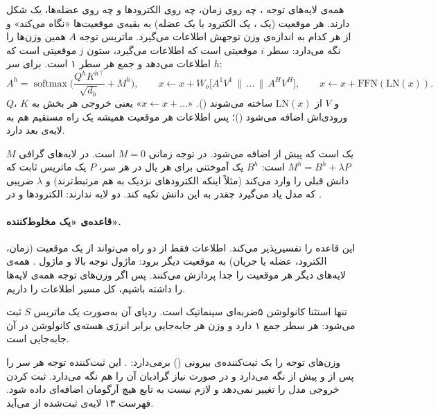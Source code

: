 همه‌ی لایه‌های توجه ، چه روی زمان، چه روی الکترودها و چه روی عضله‌ها، یک شکل دارند. هر موقعیت (یک ، یک الکترود یا یک عضله) به بقیه‌ی موقعیت‌ها «نگاه می‌کند» و از هر کدام به اندازه‌ی وزن توجهش اطلاعات می‌گیرد. ماتریس توجه $A$ همین وزن‌ها را نگه می‌دارد: سطر $i$ موقعیتی است که اطلاعات می‌گیرد، ستون $j$ موقعیتی است که اطلاعات می‌دهد و جمع هر سطر ۱ است. برای سر $h$:
\begin{equation}
A^{h}=\operatorname{softmax}\!\Big(\frac{Q^{h}K^{h\top}}{\sqrt{d_h}}+M^{h}\Big),\qquad
x\leftarrow x+W_o\big[A^{1}V^{1}\,\|\,\dots\,\|\,A^{H}V^{H}\big],\qquad x\leftarrow x+\mathrm{FFN}(\mathrm{LN}(x)).
\end{equation}
$Q$، $K$ و $V$ از $\mathrm{LN}(x)$ ساخته می‌شوند (). «$x\leftarrow x+\dots$» یعنی خروجی هر بخش به ورودی‌اش اضافه می‌شود ()؛ پس اطلاعات هر موقعیت همیشه یک راه مستقیم هم به لایه‌ی بعد دارد.

$M$ یک  است که پیش از  اضافه می‌شود. در توجه زمانی $M=0$ است. در لایه‌های گرافی $M^{h}=B^{h}+\lambda P$ است: $B^{h}$ یک  آموختنی برای هر یال در هر سر، $P$ یک ماتریس ثابت که دانش قبلی را وارد می‌کند (مثلاً اینکه الکترودهای نزدیک به هم مرتبط‌ترند) و $\lambda$ ضریبی که مدل یاد می‌گیرد چقدر به این دانش تکیه کند. دو لایه  ندارند:  الکترودها و  در .

\paragraph{قاعده‌ی «یک مخلوط‌کننده».} این قاعده  را تفسیرپذیر می‌کند. اطلاعات فقط از دو راه می‌تواند از یک موقعیت (زمان، الکترود، عضله یا جریان) به موقعیت دیگر برود: ماژول توجه بالا و ماژول . همه‌ی لایه‌های دیگر هر موقعیت را جدا پردازش می‌کنند. پس اگر وزن‌های توجه همه‌ی لایه‌ها را داشته باشیم، کل مسیر اطلاعات را داریم.

تنها استثنا کانولوشن ۵ضربه‌ای  سینماتیک است. ردپای آن به‌صورت یک ماتریس $S$ ثبت می‌شود: هر سطر جمع ۱ دارد و وزن هر جابه‌جایی برابر انرژی هسته‌ی کانولوشن در آن جابه‌جایی است.

وزن‌های توجه را یک ثبت‌کننده‌ی بیرونی () برمی‌دارد: . این ثبت‌کننده توجه هر سر را پس از  و پیش از  نگه می‌دارد و در صورت نیاز گرادیان آن را هم نگه می‌دارد. ثبت کردن خروجی مدل را تغییر نمی‌دهد و لازم نیست به تابع  هیچ آرگومان اضافه‌ای داده شود. فهرست ۱۳ لایه‌ی ثبت‌شده از  می‌آید.

